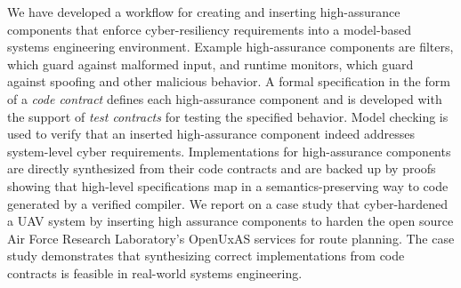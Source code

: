 
We have developed a workflow for creating and inserting high-assurance
components that enforce cyber-resiliency requirements into a
model-based systems engineering environment.  Example high-assurance
components are filters, which guard against malformed input, and
runtime monitors, which guard against spoofing and other malicious
behavior. A formal specification in the form of a \emph{code contract}
defines each high-assurance component and is developed with the
support of \emph{test contracts} for testing the specified behavior.
Model checking is used to verify that an inserted high-assurance
component indeed addresses system-level cyber
requirements. Implementations for high-assurance components are
directly synthesized from their code contracts and are backed up by
proofs showing that high-level specifications map in a
semantics-preserving way to code generated by a verified compiler.  We
report on a case study that cyber-hardened a UAV system by inserting
high assurance components to harden the open source Air Force Research
Laboratory's OpenUxAS services for route planning.  The case study
demonstrates that synthesizing correct implementations from code
contracts is feasible in real-world systems engineering.
